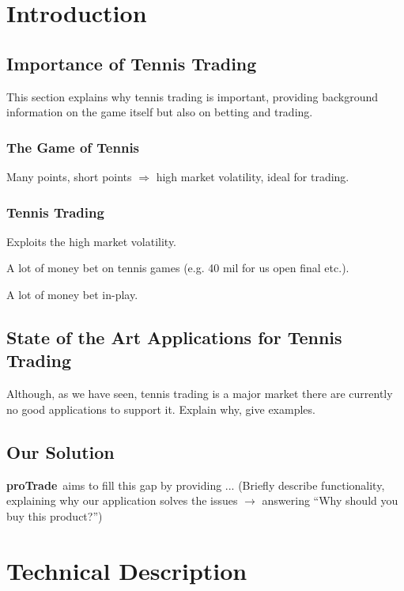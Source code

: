 \documentclass[10pt]{report}
\newcommand{\nm}{{\bf proTrade}}
\newcommand{\nmsp}{{\nm \ }}
\begin{document}
\tableofcontents

\chapter{Introduction}

\section{Importance of Tennis Trading}

This section explains why tennis trading is important, providing background information on the game itself but also on betting and trading.

\subsection{The Game of Tennis}

Many points, short points $\Rightarrow$ high market volatility, ideal for trading.

\subsection{Tennis Trading}

Exploits the high market volatility.

A lot of money bet on tennis games (e.g. 40 mil for us open final etc.).

A lot of money bet in-play.

\section{State of the Art Applications for Tennis Trading}

Although, as we have seen, tennis trading is a major market there are currently no good applications to support it.
Explain why, give examples.

\section{Our Solution}

\nmsp aims to fill this gap by providing ... (Briefly describe functionality, explaining why our application solves the issues $\rightarrow$ answering ``Why should you buy this product?'')

\chapter{Technical Description}
\end{document}
